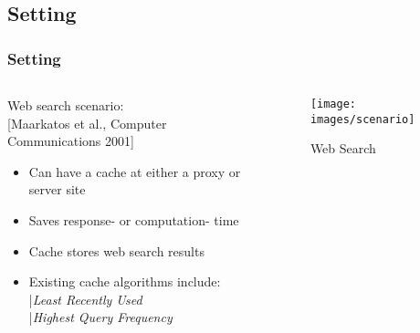 \subsection{Setting}
\begin{frame}[red] %
\frametitle{Setting}
\begin{columns}
  \begin{column}{0.5\textwidth}
  Web search scenario: { \\ \tiny [Maarkatos et al., Computer Communications 2001]}
    \begin{itemize}
    \item Can have a cache at either a proxy or server site
    \item Saves response- or computation- time
    \item Cache stores web search results
    \item Existing cache algorithms include:\\ |{\it Least Recently Used} \\|{\it Highest Query Frequency}
    \end{itemize}
  \end{column}
  \begin{column}[t]{0.5\textwidth}
    \vspace{-2em}
    \begin{figure}
    \texttt{[image: images/scenario]} 
    \caption{Web Search}
    \end{figure}
  \end{column}
\end{columns}
\end{frame}


